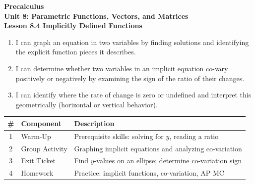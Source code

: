 \documentclass[10pt]{article}
\begin{document}
\vspace{-0.8in}

\begin{center}
  {\color{white}\textbf{\LARGE Precalculus}}\\[4pt]
  {\color{skymid}\large\textbf{Unit 8: Parametric Functions, Vectors, and Matrices}}\\[6pt]
  {\color{white}\textbf{\large Lesson 8.4 \quad Implicitly Defined Functions}}
\end{center}

\vspace{0.22in}
\namedateperiod
\vspace{0.18in}

\begin{learningtargetbox}
\small
\begin{enumerate}[leftmargin=1.5em, itemsep=5pt]
  \item I can graph an equation in two variables by finding solutions and identifying the
        explicit function pieces it describes.
  \item I can determine whether two variables in an implicit equation co-vary positively or
        negatively by examining the sign of the ratio of their changes.
  \item I can identify where the rate of change is zero or undefined and interpret this
        geometrically (horizontal or vertical behavior).
\end{enumerate}
\end{learningtargetbox}

\vspace{0.14in}

\begin{tocbox}
\small
\renewcommand{\arraystretch}{1.5}
\begin{tabularx}{\linewidth}{@{} c l X @{}}
\rowcolor{sky}
\textbf{\#} & \textbf{Component} & \textbf{Description} \\
\midrule
1 & Warm-Up       & Prerequisite skills: solving for $y$, reading a ratio \\
2 & Group Activity & Graphing implicit equations and analyzing co-variation \\
3 & Exit Ticket   & Find $y$-values on an ellipse; determine co-variation sign \\
4 & Homework      & Practice: implicit functions, co-variation, AP MC \\
\end{tabularx}
\end{tocbox}
\end{document}
